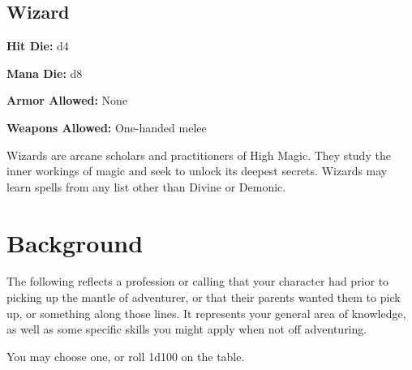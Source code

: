 \begin{multicols}{2}
\subsection{Wizard}

\textbf{Hit Die:} d4

\textbf{Mana Die:} d8

\textbf{Armor Allowed:} None

\textbf{Weapons Allowed:} One-handed melee

Wizards are arcane scholars and practitioners of High Magic. They study the inner
workings of magic and seek to unlock its deepest secrets. Wizards may learn
spells from any list other than Divine or Demonic.

\section{Background}

The following reflects a profession or calling that your character had prior
to picking up the mantle of adventurer, or that their parents wanted them to
pick up, or something along those lines. It represents your general area of
knowledge, as well as some specific skills you might apply when not off
adventuring.

You may choose one, or roll 1d100 on the table.


\end{multicols}
